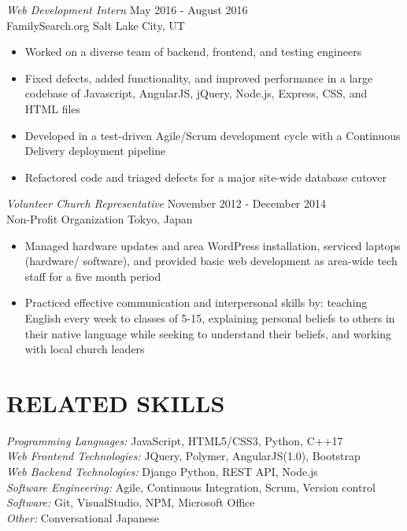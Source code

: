 \documentclass[10pt, resumewidth=7in]{res} %
\begin{document}
\begin{resume}
{\sl Web Development Intern} \hfill May 2016 - August 2016 \\
FamilySearch.org \hfill Salt Lake City, UT
\begin{itemize} \itemsep -2pt %
\item Worked on a diverse team of backend, frontend, and testing engineers
\item Fixed defects, added functionality, and improved performance in a large codebase of Javascript, AngularJS,  jQuery, Node.js, Express, CSS, and HTML files
\item Developed in a test-driven Agile/Scrum development cycle with a Continuous Delivery deployment pipeline
\item Refactored code and triaged defects for a major site-wide database cutover
\end{itemize}

{\sl Volunteer Church Representative} \hfill November 2012 - December 2014 \\
Non-Profit Organization \hfill Tokyo, Japan
\begin{itemize} \itemsep -2pt %
\item Managed hardware updates and area WordPress installation, serviced laptops (hardware/ software), and provided basic web development as area-wide tech staff for a five month period
\item Practiced effective communication and interpersonal skills by: teaching English every week to classes of 5-15, explaining personal beliefs to others in their native language while seeking to understand their beliefs, and working with local church leaders
\end{itemize}


\section{RELATED SKILLS}
{\sl Programming Languages:} JavaScript, HTML5/CSS3, Python, C++17\\
{\sl Web Frontend Technologies:} JQuery, Polymer, AngularJS(1.0), Bootstrap \\
{\sl Web Backend Technologies:} Django Python, REST API, Node.js \\
{\sl Software Engineering:} Agile, Continuous Integration, Scrum, Version control \\
{\sl Software:} Git, VisualStudio, NPM, Microsoft Office \\
{\sl Other:} Conversational Japanese


\end{resume}
\end{document}
